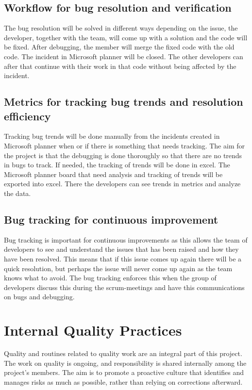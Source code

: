 \documentclass{article}
\begin{document}
\subsection{Workflow for bug resolution and verification}
The bug resolution will be solved in different ways depending on the issue, the developer, together with the team, will come up with a solution and the code will be fixed. After debugging, the member will merge the fixed code with the old code. The incident in Microsoft planner will be closed. The other developers can after that continue with their work in that code without being affected by the incident. 


\subsection{Metrics for tracking bug trends and resolution efficiency}
Tracking bug trends will be done manually from the incidents created in Microsoft planner when or if there is something that needs tracking. The aim for the project is that the debugging is done thoroughly so that there are no trends in bugs to track. If needed,  the tracking of trends will be done in excel. The Microsoft planner board that need analysis and tracking of trends will be exported into excel. There the developers can see trends in metrics and analyze the data. 


\subsection{Bug tracking for continuous improvement}
Bug tracking is important for continuous improvements as this allows the team of developers to see and understand the issues that has been raised and how they have been resolved. This means that if this issue comes up again there will be a quick resolution, but perhaps the issue will never come up again as the team knows what to avoid. The bug tracking enforces this when the group of developers discuss this during the scrum-meetings and have this communications on bugs and debugging.



\newpage
\section{Internal Quality Practices}

Quality and routines related to quality work are an integral part of this project. The work on quality is ongoing, and responsibility is shared internally among the project’s members. The aim is to promote a proactive culture that identifies and manages risks as much as possible, rather than relying on corrections afterward.
\end{document}
